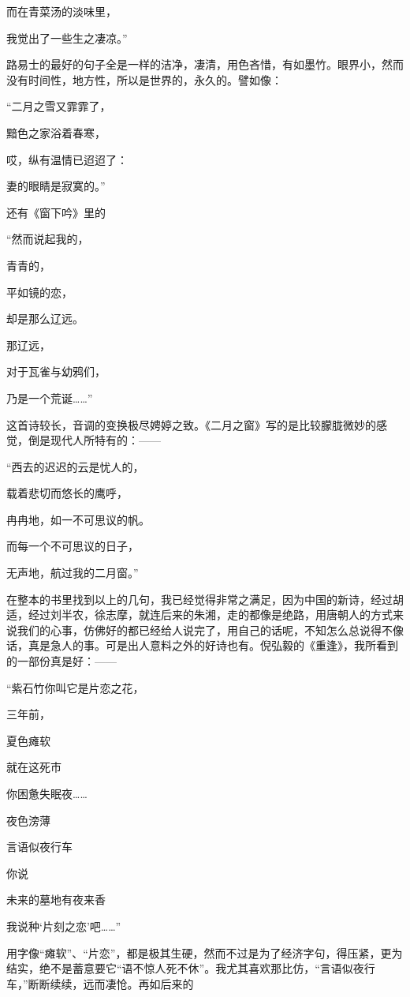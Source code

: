 \par 而在青菜汤的淡味里，
\par 我觉出了一些生之凄凉。”
\par 路易士的最好的句子全是一样的洁净，凄清，用色吝惜，有如墨竹。眼界小，然而没有时间性，地方性，所以是世界的，永久的。譬如像：
\par “二月之雪又霏霏了，
\par 黯色之家浴着春寒，
\par 哎，纵有温情已迢迢了：
\par 妻的眼睛是寂寞的。”
\par 还有《窗下吟》里的
\par “然而说起我的，
\par 青青的，
\par 平如镜的恋，
\par 却是那么辽远。
\par 那辽远，
\par 对于瓦雀与幼鸦们，
\par 乃是一个荒诞……”
\par 这首诗较长，音调的变换极尽娉婷之致。《二月之窗》写的是比较朦胧微妙的感觉，倒是现代人所特有的：——
\par “西去的迟迟的云是忧人的，
\par 载着悲切而悠长的鹰呼，
\par 冉冉地，如一不可思议的帆。
\par 而每一个不可思议的日子，
\par 无声地，航过我的二月窗。”
\par 在整本的书里找到以上的几句，我已经觉得非常之满足，因为中国的新诗，经过胡适，经过刘半农，徐志摩，就连后来的朱湘，走的都像是绝路，用唐朝人的方式来说我们的心事，仿佛好的都已经给人说完了，用自己的话呢，不知怎么总说得不像话，真是急人的事。可是出人意料之外的好诗也有。倪弘毅的《重逢》，我所看到的一部份真是好：——
\par “紫石竹你叫它是片恋之花，
\par 三年前，
\par 夏色瘫软
\par 就在这死市
\par 你困惫失眠夜……
\par 夜色滂薄
\par 言语似夜行车
\par 你说
\par 未来的墓地有夜来香
\par 我说种‘片刻之恋’吧……”
\par 用字像“瘫软”、“片恋”，都是极其生硬，然而不过是为了经济字句，得压紧，更为结实，绝不是蓄意要它“语不惊人死不休”。我尤其喜欢那比仿，“言语似夜行车，”断断续续，远而凄怆。再如后来的
